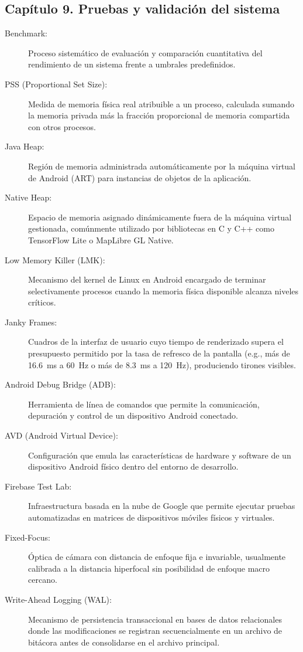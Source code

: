 \subsection*{Capítulo 9. Pruebas y validación del sistema}
\begin{description}
    \item[Benchmark:] Proceso sistemático de evaluación y comparación cuantitativa del rendimiento de un sistema frente a umbrales predefinidos.
    \item[PSS (Proportional Set Size):] Medida de memoria física real atribuible a un proceso, calculada sumando la memoria privada más la fracción proporcional de memoria compartida con otros procesos.
    \item[Java Heap:] Región de memoria administrada automáticamente por la máquina virtual de Android (ART) para instancias de objetos de la aplicación.
    \item[Native Heap:] Espacio de memoria asignado dinámicamente fuera de la máquina virtual gestionada, comúnmente utilizado por bibliotecas en C y C++ como TensorFlow Lite o MapLibre GL Native.
    \item[Low Memory Killer (LMK):] Mecanismo del kernel de Linux en Android encargado de terminar selectivamente procesos cuando la memoria física disponible alcanza niveles críticos.
    \item[Janky Frames:] Cuadros de la interfaz de usuario cuyo tiempo de renderizado supera el presupuesto permitido por la tasa de refresco de la pantalla (e.g., más de 16.6~ms a 60~Hz o más de 8.3~ms a 120~Hz), produciendo tirones visibles.
    \item[Android Debug Bridge (ADB):] Herramienta de línea de comandos que permite la comunicación, depuración y control de un dispositivo Android conectado.
    \item[AVD (Android Virtual Device):] Configuración que emula las características de hardware y software de un dispositivo Android físico dentro del entorno de desarrollo.
    \item[Firebase Test Lab:] Infraestructura basada en la nube de Google que permite ejecutar pruebas automatizadas en matrices de dispositivos móviles físicos y virtuales.
    \item[Fixed-Focus:] Óptica de cámara con distancia de enfoque fija e invariable, usualmente calibrada a la distancia hiperfocal sin posibilidad de enfoque macro cercano.
    \item[Write-Ahead Logging (WAL):] Mecanismo de persistencia transaccional en bases de datos relacionales donde las modificaciones se registran secuencialmente en un archivo de bitácora antes de consolidarse en el archivo principal.

\end{description}
